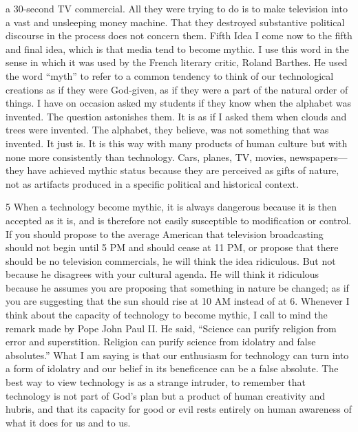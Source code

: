 a 30-second TV commercial. All they were trying to do is to make television into a vast and unsleeping
money machine. That they destroyed substantive political discourse in the process does not concern them.
Fifth Idea
I come now to the fifth and final idea, which is that media tend to become mythic. I use this word in the
sense in which it was used by the French literary critic, Roland Barthes. He used the word “myth” to refer
to a common tendency to think of our technological creations as if they were God-given, as if they were a
part of the natural order of things. I have on occasion asked my students if they know when the alphabet
was invented. The question astonishes them. It is as if I asked them when clouds and trees were invented.
The alphabet, they believe, was not something that was invented. It just is. It is this way with many
products of human culture but with none more consistently than technology. Cars, planes, TV, movies,
newspapers—they have achieved mythic status because they are perceived as gifts of nature, not as artifacts
produced in a specific political and historical context. 


5
When a technology become mythic, it is always dangerous because it is then accepted as it is, and is
therefore not easily susceptible to modification or control. If you should propose to the average American
that television broadcasting should not begin until 5 PM and should cease at 11 PM, or propose that there
should be no television commercials, he will think the idea ridiculous. But not because he disagrees with
your cultural agenda. He will think it ridiculous because he assumes you are proposing that something in
nature be changed; as if you are suggesting that the sun should rise at 10 AM instead of at 6.
Whenever I think about the capacity of technology to become mythic, I call to mind the remark made by
Pope John Paul II. He said, “Science can purify religion from error and superstition. Religion can purify
science from idolatry and false absolutes.”
What I am saying is that our enthusiasm for technology can turn into a form of idolatry and our belief in its
beneficence can be a false absolute. The best way to view technology is as a strange intruder, to remember
that technology is not part of God’s plan but a product of human creativity and hubris, and that its capacity
for good or evil rests entirely on human awareness of what it does for us and to us.


